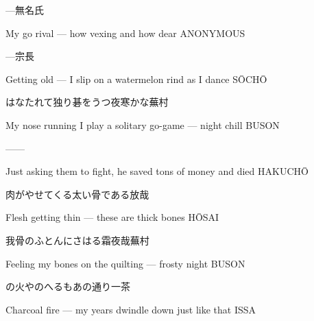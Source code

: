 \begin{haiku}
    {---}\hfill{\FH 無名氏}

    \vin{} My go rival ---
    \vin{} \vin{} how vexing
    \vin{} \vin{} \vin{} and how dear \hspace{\fill} ANONYMOUS
\end{haiku}

\begin{haiku}
    {---}\hfill{\FH 宗長}

    \vin{} Getting old ---
    \vin{} \vin{} I slip on a watermelon rind
    \vin{} \vin{} \vin{} as I dance \hspace{\fill} S\={O}CH\={O}
\end{haiku}

\begin{haiku}
    {\FH はなたれて独り碁をうつ夜寒かな}\hfill{\FH 蕪村}

    \vin{} My nose running
    \vin{} \vin{} I play a solitary go-game ---
    \vin{} \vin{} \vin{} night chill \hspace{\fill} BUSON
\end{haiku}

\begin{haiku}
    ---\hfill{---}

    \vin{} Just asking them to fight,
    \vin{} \vin{} he saved tons of money
    \vin{} \vin{} \vin{} and died \hspace{\fill} HAKUCH\={O}
\end{haiku}

\begin{haiku}
    {\FH 肉がやせてくる太い骨である}\hfill{\FH 放哉}

    \vin{} Flesh getting thin ---
    \vin{} \vin{} these are thick bones \hspace{\fill} H\={O}SAI
\end{haiku}

\begin{haiku}
    {\FH 我骨のふとんにさはる霜夜哉}\hfill{\FH 蕪村}

    \vin{} Feeling my bones
    \vin{} \vin{} on the quilting ---
    \vin{} \vin{} \vin{} frosty night \hspace{\fill} BUSON
\end{haiku}

\begin{haiku}
    {\FH {}の火やのへるもあの通り}\hfill{\FH 一茶}

    \vin{} Charcoal fire ---
    \vin{} \vin{} my years dwindle down
    \vin{} \vin{} \vin{} just like that \hspace{\fill} ISSA
\end{haiku}

